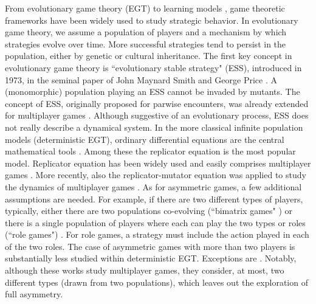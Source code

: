 \documentclass[11pt]{article}
\theoremstyle{plainCl1}
\theoremstyle{plainCl2}
\begin{document}
From evolutionary game theory (EGT) \cite{Maynard-Smith:Nature:1973, Maynard-Smith:book:1982, Hofbauer:book:1998, Nowak:book:2006} to learning models \cite{Sandholm:BioSys:1996, Fudenberg:book:1998b, Macy:PNAS:2002, Pangallo:GEB:2022}, game theoretic frameworks have been widely used to study strategic behavior. 
In evolutionary game theory, we assume a population of players and a mechanism by which strategies evolve over time. More successful strategies tend to persist in the population, either by genetic or cultural inheritance. The first key concept in evolutionary game theory is ``evolutionary stable strategy" (ESS),  introduced in 1973, in the seminal paper of John Maynard Smith and George Price \cite{Maynard-Smith:Nature:1973}. A (monomorphic) population playing an ESS cannot be invaded by mutants. The concept of ESS, originally proposed for parwise encounters, was already extended for multiplayer games \cite{Palm:JMB:1984, Broom:BMB:1997, Bukowski:IJGT:2004}. Although suggestive of an evolutionary process, ESS does not really describe a dynamical system. In the more classical infinite population models (deterministic EGT), ordinary differential equations are the central mathematical tools \cite{Hofbauer:book:1998}. Among these the replicator equation \cite{Taylor:MB:1978, Hofbauer:book:1998} is the most popular model. Replicator equation has been widely used and easily comprises multiplayer games \cite{Hauert:JTB:2006a, gokhale:PNAS:2010, Pena:Evolution:2011, Cressman:PNAS:2014, Pena:JTB:2014}. More recently, also the replicator-mutator equation was applied to study the dynamics of multiplayer games \cite{Duong:DGAA:2020}. As for asymmetric games, a few additional assumptions are needed. For example, if there are two different types of players, typically, either there are two populations co-evolving (``bimatrix games" \cite{Hofbauer:book:1998, Gokhale:PRSB:2012, Tuyls:SciRep:2018}) or there is a single population of players where each can play the two types or roles (``role games") \cite{Hofbauer:book:1998}. For role games, a strategy must include the action played in each of the two roles. The case of asymmetric games with more than two players is substantially less studied within deterministic EGT. Exceptions are  \cite{Gokhale:PRSB:2012, Zhang:arxiv:2022}. Notably, although these works study multiplayer games, they consider, at most, two different types (drawn from two populations), which leaves out the exploration of full asymmetry.
\\ \\
\end{document}
